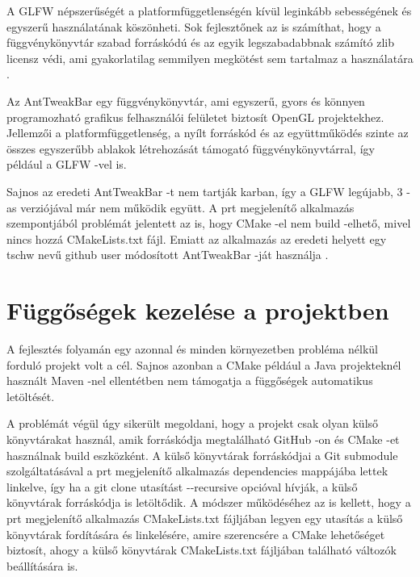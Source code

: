 A GLFW népszerűségét a platformfüggetlenségén kívül 
leginkább sebességének 
és egyszerű használatának köszönheti. 
Sok fejlesztőnek az is számíthat, 
hogy a függvénykönyvtár szabad forráskódú 
és az egyik legszabadabbnak számító zlib licensz védi, 
ami gyakorlatilag semmilyen 
megkötést sem tartalmaz a használatára \cite{glfw}.

\vspace{3mm}


\vspace{3mm}

Az AntTweakBar egy függvénykönyvtár, ami egyszerű, 
gyors és könnyen programozható 
grafikus felhasználói felületet biztosít OpenGL projektekhez. 
Jellemzői a platformfüggetlenség, 
a nyílt forráskód és 
az együttműködés szinte az összes egyszerűbb ablakok létrehozását 
támogató függvénykönyvtárral, 
így például a GLFW -vel is.

Sajnos az eredeti AntTweakBar -t nem tartják karban, 
így a GLFW legújabb, 
3 -as verziójával már nem működik együtt. 
A prt megjelenítő alkalmazás szempontjából 
problémát jelentett az is, 
hogy CMake -el nem build -elhető,
mivel nincs hozzá CMakeLists.txt fájl. 
Emiatt az alkalmazás az eredeti helyett 
egy tschw nevű github user 
módosított AntTweakBar -ját használja \cite{anttweakbar}.

\section{Függőségek kezelése a projektben}

A fejlesztés folyamán egy azonnal 
és minden környezetben probléma nélkül forduló projekt volt a cél. 
Sajnos azonban a CMake például 
a Java projekteknél használt Maven -nel ellentétben 
nem támogatja a függőségek automatikus letöltését. 

A problémát végül úgy sikerült megoldani, 
hogy a projekt csak olyan külső könyvtárakat használ, 
amik forráskódja megtalálható GitHub -on 
és CMake -et használnak build eszközként. 
A külső könyvtárak forráskódjai 
a Git submodule szolgáltatásával a prt megjelenítő 
alkalmazás dependencies mappájába lettek linkelve, 
így ha a {\ttfamily git clone} utasítást {\ttfamily -{}-recursive} 
opcióval hívják, 
a külső könyvtárak forráskódja is letöltődik. 
A módszer működéséhez az is kellett, 
hogy a prt megjelenítő alkalmazás {\ttfamily CMakeLists.txt} fájljában 
legyen egy utasítás a külső könyvtárak fordítására és linkelésére, 
amire szerencsére a CMake lehetőséget biztosít, 
ahogy a külső könyvtárak {\ttfamily CMakeLists.txt} 
fájljában található változók beállítására is. 

